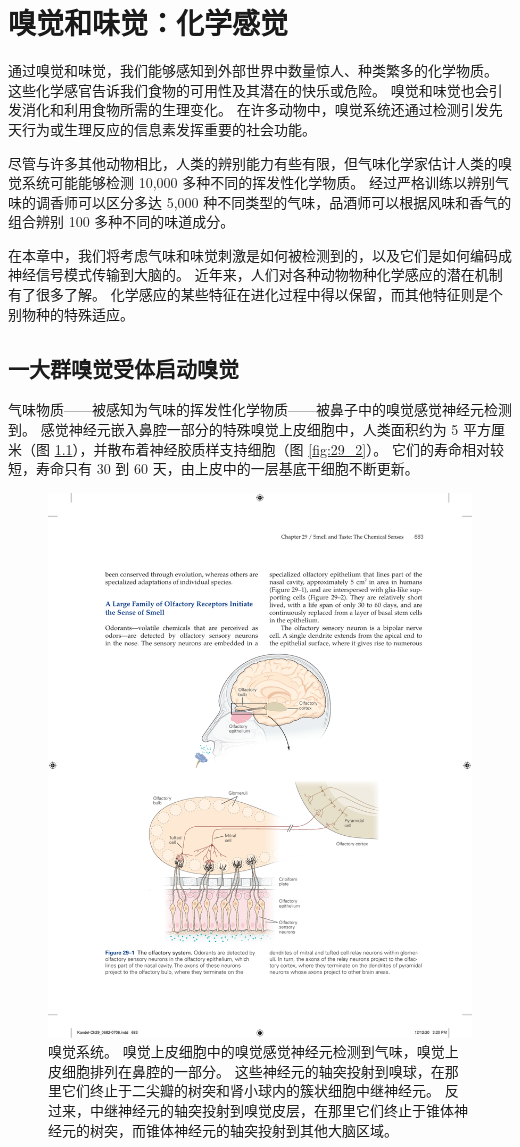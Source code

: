 \chapter{嗅觉和味觉：化学感觉} \label{chap:chap29}
通过嗅觉和味觉，我们能够感知到外部世界中数量惊人、种类繁多的化学物质。 这些化学感官告诉我们食物的可用性及其潜在的快乐或危险。 嗅觉和味觉也会引发消化和利用食物所需的生理变化。 在许多动物中，嗅觉系统还通过检测引发先天行为或生理反应的信息素发挥重要的社会功能。

尽管与许多其他动物相比，人类的辨别能力有些有限，但气味化学家估计人类的嗅觉系统可能能够检测 10,000 多种不同的挥发性化学物质。 经过严格训练以辨别气味的调香师可以区分多达 5,000 种不同类型的气味，品酒师可以根据风味和香气的组合辨别 100 多种不同的味道成分。

在本章中，我们将考虑气味和味觉刺激是如何被检测到的，以及它们是如何编码成神经信号模式传输到大脑的。 近年来，人们对各种动物物种化学感应的潜在机制有了很多了解。 化学感应的某些特征在进化过程中得以保留，而其他特征则是个别物种的特殊适应。

\section{一大群嗅觉受体启动嗅觉}
气味物质——被感知为气味的挥发性化学物质——被鼻子中的嗅觉感觉神经元检测到。 
感觉神经元嵌入鼻腔一部分的特殊嗅觉上皮细胞中，人类面积约为 5 平方厘米（图 \ref{fig:29_1}），并散布着神经胶质样支持细胞（图 \ref{fig:29_2}）。
它们的寿命相对较短，寿命只有 30 到 60 天，由上皮中的一层基底干细胞不断更新。


\begin{figure}[htbp]
	\centering
	\includegraphics[width=0.7\linewidth]{chap29/fig_29_1}
	\caption{嗅觉系统。 嗅觉上皮细胞中的嗅觉感觉神经元检测到气味，嗅觉上皮细胞排列在鼻腔的一部分。 这些神经元的轴突投射到嗅球，在那里它们终止于二尖瓣的树突和肾小球内的簇状细胞中继神经元。 反过来，中继神经元的轴突投射到嗅觉皮层，在那里它们终止于锥体神经元的树突，而锥体神经元的轴突投射到其他大脑区域。}
	\label{fig:29_1}
\end{figure}


